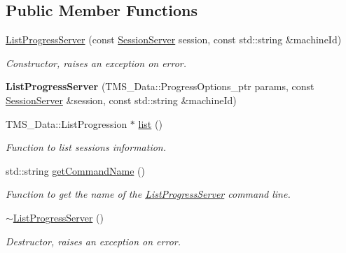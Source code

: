 \subsection*{Public Member Functions}
\begin{DoxyCompactItemize}
\item 
\hyperlink{classListProgressServer_a49042d8db19b90501711398c913d4b31}{ListProgressServer} (const \hyperlink{classSessionServer}{SessionServer} session, const std::string \&machineId)
\begin{DoxyCompactList}\small\item\em Constructor, raises an exception on error. \item\end{DoxyCompactList}\item 
\hypertarget{classListProgressServer_ab2de6df88e4616749465a398ae3f7c44}{
{\bfseries ListProgressServer} (TMS\_\-Data::ProgressOptions\_\-ptr params, const \hyperlink{classSessionServer}{SessionServer} \&session, const std::string \&machineId)}
\label{classListProgressServer_ab2de6df88e4616749465a398ae3f7c44}

\item 
TMS\_\-Data::ListProgression $\ast$ \hyperlink{classListProgressServer_a5d3eddd164119897299006b9940845ae}{list} ()
\begin{DoxyCompactList}\small\item\em Function to list sessions information. \item\end{DoxyCompactList}\item 
std::string \hyperlink{classListProgressServer_a9fefff901176f068962ab31ae42c25aa}{getCommandName} ()
\begin{DoxyCompactList}\small\item\em Function to get the name of the \hyperlink{classListProgressServer}{ListProgressServer} command line. \item\end{DoxyCompactList}\item 
\hypertarget{classListProgressServer_a61ed79d6958db9b81d298a9e2dce8382}{
\hyperlink{classListProgressServer_a61ed79d6958db9b81d298a9e2dce8382}{$\sim$ListProgressServer} ()}
\label{classListProgressServer_a61ed79d6958db9b81d298a9e2dce8382}

\begin{DoxyCompactList}\small\item\em Destructor, raises an exception on error. \item\end{DoxyCompactList}\end{DoxyCompactItemize}
